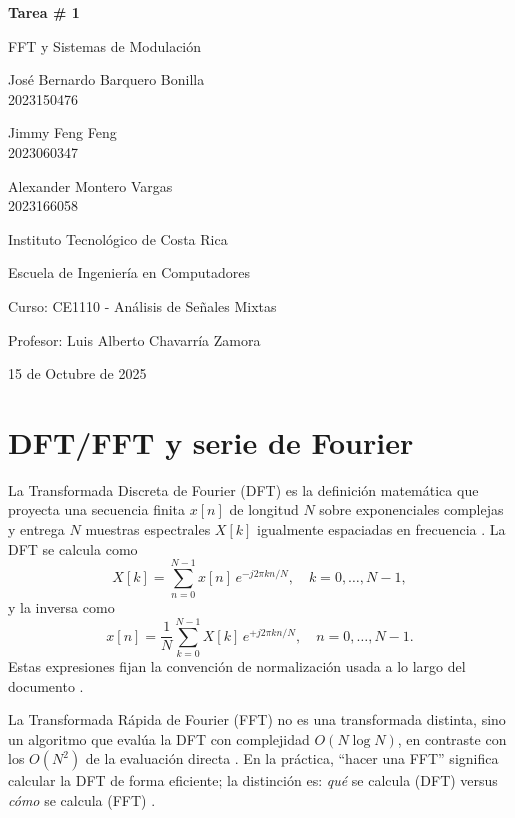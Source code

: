 \documentclass[letter,12pt]{article}
\begin{document}
\begin{titlepage}
    \centering
    {\LARGE \textbf{Tarea \# 1} \par}
    {\LARGE FFT y Sistemas de Modulación \par}
    \vspace{1.5cm}
    {\large José Bernardo Barquero Bonilla \\ 2023150476 \par}
    {\large Jimmy Feng Feng \\ 2023060347 \par}
    {\large Alexander Montero Vargas \\ 2023166058 \par}
    \vspace{1.5cm}
    {\Large Instituto Tecnológico de Costa Rica \par}
    {\large Escuela de Ingeniería en Computadores \par}
    {\large Curso: CE1110 - Análisis de Señales Mixtas \par}
    \vspace{1.5cm}
    {\large Profesor: Luis Alberto Chavarría Zamora \par}
    \vfill
    {\large 15 de Octubre de 2025 \par}
\end{titlepage}

\section{DFT/FFT y serie de Fourier}

La Transformada Discreta de Fourier (DFT) es la definición matemática que proyecta una secuencia finita \(x[n]\) de longitud \(N\) sobre exponenciales complejas y entrega \(N\) muestras espectrales \(X[k]\) igualmente espaciadas en frecuencia \cite{OppenheimSchaferDTSP3e,VetterliKovacevicGoyalFSP2014}. La DFT se calcula como
\[
X[k]=\sum_{n=0}^{N-1} x[n]\,e^{-j2\pi kn/N},\quad k=0,\dots,N-1,
\]
y la inversa como
\[
x[n]=\frac{1}{N}\sum_{k=0}^{N-1} X[k]\,e^{+j2\pi kn/N},\quad n=0,\dots,N-1.
\]
Estas expresiones fijan la convención de normalización usada a lo largo del documento \cite{OppenheimSchaferDTSP3e}.

La Transformada Rápida de Fourier (FFT) no es una transformada distinta, sino un algoritmo que evalúa la DFT con complejidad \(O(N\log N)\), en contraste con los \(O(N^2)\) de la evaluación directa \cite{CooleyTukey1965}. En la práctica, “hacer una FFT” significa calcular la DFT de forma eficiente; la distinción es: \emph{qué} se calcula (DFT) versus \emph{cómo} se calcula (FFT) \cite{OppenheimSchaferDTSP3e,NumPyFFT2024}.
\end{document}
